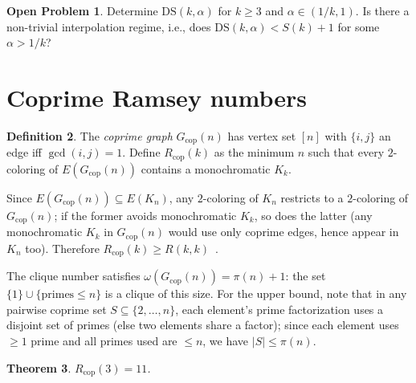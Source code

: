 \documentclass[11pt]{article}
\theoremstyle{plain}
\newtheorem{theorem}{Theorem}[section]
\theoremstyle{definition}
\newtheorem{definition}[theorem]{Definition}
\newtheorem{problem}[theorem]{Open Problem}
\newcommand{\DS}{\mathrm{DS}}
\newcommand{\Rcop}{R_{\mathrm{cop}}}
\newcommand{\Gcop}{G_{\mathrm{cop}}}
\begin{document}
\begin{problem}\label{prob:ds}
Determine $\DS(k,\alpha)$ for $k\ge 3$ and $\alpha\in(1/k,1)$.
Is there a non-trivial interpolation regime, i.e., does
$\DS(k,\alpha)<S(k)+1$ for some $\alpha>1/k$?
\end{problem}

\section{Coprime Ramsey numbers}\label{sec:rcop}

\begin{definition}\label{def:rcop}
The \emph{coprime graph} $\Gcop(n)$ has vertex set $[n]$ with
$\{i,j\}$ an edge iff $\gcd(i,j)=1$. Define $\Rcop(k)$ as the
minimum $n$ such that every $2$-coloring of $E(\Gcop(n))$ contains a
monochromatic $K_k$.
\end{definition}

Since $E(\Gcop(n))\subseteq E(K_n)$, any $2$-coloring of $K_n$
restricts to a $2$-coloring of $\Gcop(n)$; if the former avoids
monochromatic $K_k$, so does the latter (any monochromatic $K_k$ in
$\Gcop(n)$ would use only coprime edges, hence appear in $K_n$ too).
Therefore $\Rcop(k)\ge R(k,k)$~\cite{ramsey1930}.

The clique number satisfies $\omega(\Gcop(n))=\pi(n)+1$: the set
$\{1\}\cup\{\text{primes}\le n\}$ is a clique of this size. For the
upper bound, note that in any pairwise coprime set $S\subseteq\{2,
\ldots,n\}$, each element's prime factorization uses a disjoint set
of primes (else two elements share a factor); since each element
uses $\ge 1$ prime and all primes used are $\le n$, we have
$|S|\le\pi(n)$.

\begin{theorem}\label{thm:rcop3}
$\Rcop(3)=11$.
\end{theorem}
\end{document}
